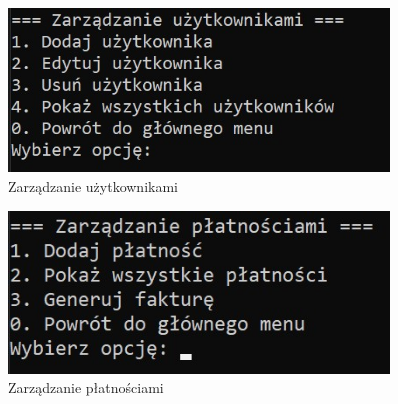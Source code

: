 \begin{figure}[htbp]
  \centering
  \includegraphics[width=0.9\textwidth]{figures/zarzadzanie_urzytkownikami.jpg} 
  \caption{Zarządzanie użytkownikami}
  \label{fig:obrazek}
\end{figure}

\begin{figure}[htbp]
  \centering
  \includegraphics[width=0.9\textwidth]{figures/zarzadzanie_platnosciami.jpg} 
  \caption{Zarządzanie płatnościami}
  \label{fig:obrazek}
\end{figure}


